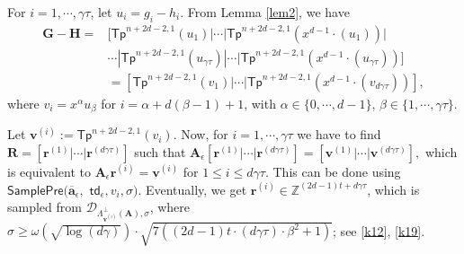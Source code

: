 \documentclass[runningheads]{llncs}
\begin{document}
 For $i=1,\cdots, \gamma \tau$, let $u_i=g_i-h_i$. 
From Lemma \ref{lem2}, we have
 \begin{equation*}\label{k9}
 \begin{split}
   \mathbf{G}-\mathbf{H}=&[ \mathsf{Tp}^{n+2d-2,1}(u_1) | \cdots | \mathsf{Tp}^{n+2d-2,1}(x^{d-1}\cdot (u_1)) |\\
   &\cdots |\mathsf{Tp}^{n+2d-2,1}(u_{\gamma \tau}) |\cdots |\mathsf{Tp}^{n+2d-2,1}(x^{d-1}\cdot (u_{\gamma \tau}))]\\
   &=[ \mathsf{Tp}^{n+2d-2,1}(v_1) | \cdots | \mathsf{Tp}^{n+2d-2,1}(x^{d-1}\cdot (v_{d\gamma\tau}))],
    \end{split}
  \end{equation*}
  where $v_i=x^\alpha u_\beta$ for $i=\alpha+d(\beta-1)+1$, with 
   $\alpha \in \{0,\cdots, d-1\}$, $\beta \in \{1,\cdots, \gamma \tau \}$. 
   \iffalse
    
       \begin{equation*}
    \begin{split}
    \mathbf{G}-\mathbf{H}
    =&[\mathsf{Tp}^{n+d-1,d}(1-h_{0,0})|\mathsf{Tp}^{n+d-1,d}(2-2\cdot h_{0,0})|\cdots \\ 
    &|\mathsf{Tp}^{n+d-1,d}(2^{\tau-1}-2^{\tau-1}\cdot h_{0,\tau-1})|
    \mathsf{Tp}^{n+d-1,d}(x^d-h_{1,0}\cdot x)|\\
    &\mathsf{Tp}^{n+d-1,d}(2x^d-2\cdot h_{1,1}\cdot x)|
    \cdots| \mathsf{Tp}^{n+d-1,d}(2^{\tau-1}\cdot x^d-2^{\tau-1}\cdot h_{1,\tau-1}\cdot x)|\\
    &|\cdots|\mathsf{Tp}^{n+d-1,d}(2\cdot x^{(\gamma-1)d}-2\cdot h_{(\gamma-1)d,0}\cdot x)|\\
    &\cdots| \mathsf{Tp}^{n+d-1,d}(2^{\tau-1}\cdot x^{(\gamma-1)d}-2^{\tau-1}\cdot h_{(\gamma-1)d,\tau-1}\cdot x^{(\gamma-1)d})]\\
    &=[\mathsf{Tp}^{n+d-1,d}(u_1)|\cdots| \mathsf{Tp}^{n+d-1,d}(u_{\gamma\tau})],\\
    \end{split}
    \end{equation*}
    \fi
Let $\mathbf{v}^{(i)}:=\mathsf{Tp}^{n+2d-2,1}(v_i)$. Now, for $i=1,\cdots, \gamma \tau$ we have to find $\mathbf{R}=[\textbf{r}^{(1)}|\cdots|\textbf{r}^{(d\gamma \tau)}]$ such that   $\mathbf{A}_{\epsilon}[\textbf{r}^{(1)}|\cdots|\textbf{r}^{(d\gamma \tau)}]=[\textbf{v}^{(1)}|\cdots|\textbf{v}^{(d\gamma \tau)}],$ which is equivalent to $\mathbf{A}_{\epsilon}\textbf{r}^{(i)}=\textbf{v}^{(i)}$ for $1\leq i \leq d\gamma \tau$. This can be done using $\mathsf{SamplePre}(\overline{\textbf{a}}_{\epsilon},$ $\mathsf{td}_{\epsilon}, v_i,\sigma)$. 
Eventually, we get $\mathbf{r}^{(i)} \in \mathbb{Z}^{(2d-1)t+d\gamma \tau}$, which is sampled from $\mathcal{D}_{\Lambda^{\bot}_{\textbf{v}^{(i)}}(\textbf{A}),\sigma}$, where $\sigma \geq \omega(\sqrt{\log(d \gamma)})\cdot \sqrt{7((2d-1)t \cdot (d\gamma \tau)\cdot \beta^2+1)}$; see \eqref{k12}, \eqref{k19}.  
 
\end{document}
